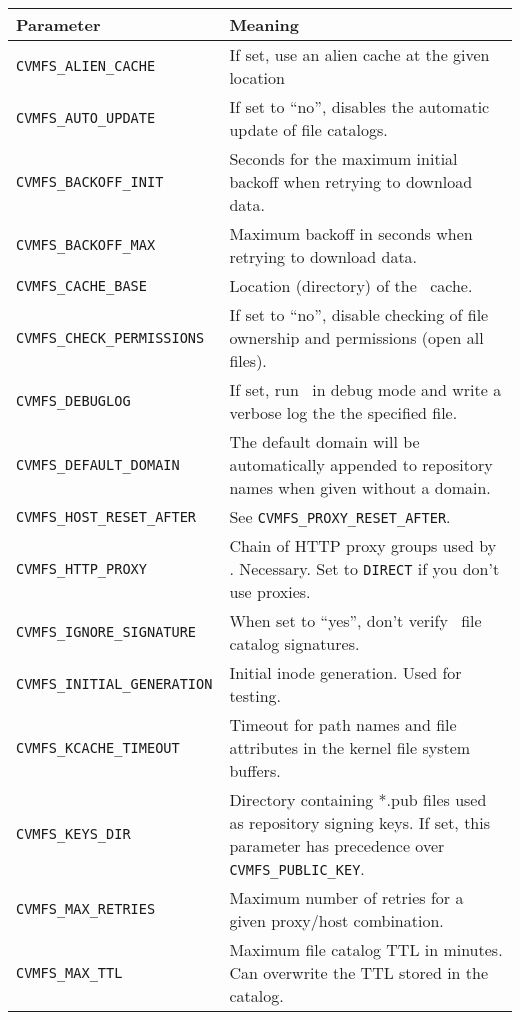 	\begin{longtable}{lX}
		\toprule
		{\bf\centering Parameter} 			& {\bf\centering Meaning}\\
		\midrule
		\tt CVMFS\_ALIEN\_CACHE			& If set, use an alien cache at the given location\\
		\tt CVMFS\_AUTO\_UPDATE			& If set to ``no'', disables the automatic update of file catalogs.\\
		\tt CVMFS\_BACKOFF\_INIT			& Seconds for the maximum initial backoff when retrying to download data.\\ 
		\tt CVMFS\_BACKOFF\_MAX			& Maximum backoff in seconds when retrying to download data.\\
		\tt CVMFS\_CACHE\_BASE				& Location (directory) of the \cvmfs\ cache.\\
		\tt CVMFS\_CHECK\_PERMISSIONS		& If set to ``no'', disable checking of file ownership and permissions (open all files).\\
		\tt CVMFS\_DEBUGLOG				& If set, run \cvmfs\ in debug mode and write a verbose log the the specified file.\\
		\tt CVMFS\_DEFAULT\_DOMAIN			& The default domain will be automatically appended to repository names when given without a domain.\\
		\tt CVMFS\_HOST\_RESET\_AFTER		& See \texttt{CVMFS\_PROXY\_RESET\_AFTER}.\\
		\tt CVMFS\_HTTP\_PROXY				& Chain of HTTP proxy groups used by \cvmfs. Necessary. Set to \texttt{DIRECT} if you don't use proxies.\\
		\tt CVMFS\_IGNORE\_SIGNATURE		& When set to ``yes'', don't verify \cvmfs\ file catalog signatures.\\
		\tt CVMFS\_INITIAL\_GENERATION		& Initial inode generation.  Used for testing.\\
		\tt CVMFS\_KCACHE\_TIMEOUT			& Timeout for path names and file attributes in the kernel file system buffers.\\
		\tt CVMFS\_KEYS\_DIR				& Directory containing *.pub files used as repository signing keys.  If set, this parameter has precedence over \texttt{CVMFS\_PUBLIC\_KEY}.\\
		\tt CVMFS\_MAX\_RETRIES			& Maximum number of retries for a given proxy/host combination.\\
		\tt CVMFS\_MAX\_TTL				& Maximum file catalog TTL in minutes.  Can overwrite the TTL stored in the catalog.\\

\end{longtable}
